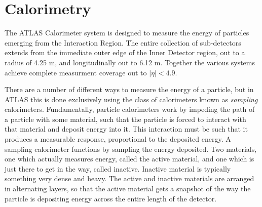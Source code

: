 

\section{Calorimetry} %

    The ATLAS Calorimeter system is designed to measure the energy of particles emerging from the Interaction Region.
    The entire collection of sub-detectors extends from the immediate outer edge of the Inner Detector region, out to a radius of 4.25 m, and longitudinally out to 6.12 m.
    Together the various systems achieve complete measurment coverage out to $|\eta| < 4.9$.

    There are a number of different ways to measure the energy of a particle, but in ATLAS this is done exclusively using the class of calorimeters known as \textit{sampling} calorimeters.
    Fundamentally, particle calorimeters work by impeding the path of a particle with some material, such that the particle is forced to interact with that material and deposit energy into it.
    This interaction must be such that it produces a measurable response, proportional to the deposited energy.
    A sampling calorimeter functions by sampling the energy deposited.
    Two materials, one which actually measures energy, called the active material, and one which is just there to get in the way, called inactive.
    Inactive material is typically something very dense and heavy.
    The active and inactive materials are arranged in alternating layers, so that the active material gets a snapshot of the way the particle is depositing energy across the entire length of the detector.\cite{energy_measurement}

